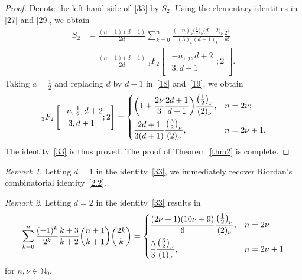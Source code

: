 \documentclass[reqno]{amsart}
\numberwithin{equation}{section}
\theoremstyle{plain}
\theoremstyle{remark}
\newtheorem{rem}{Remark}[section]
\begin{document}
\begin{proof}
Denote the left-hand side of~\eqref{33} by $S_2$.
Using the elementary identities in \eqref{27} and \eqref{29}, we obtain
\begin{align*}
S_2&=\frac{(n+1)(d+1)}{2d}\sum_{k=0}^{n}\frac{(-n)_k\bigl(\frac{1}{2}\bigr)_k\bigl(d+2\bigr)_k}{(3)_k(d+1)_k}\frac{2^k}{k!}\\
&=\frac{(n+1)(d+1)}{2d}{\,}_3F_2\begin{bmatrix}\begin{gathered}-n, \tfrac12, d+2\\ 3, d+1 \end{gathered};2\end{bmatrix}.
\end{align*}
Taking $a=\frac{1}{2}$ and replacing $d$ by $d+1$ in~\eqref{18} and~\eqref{19}, we obtain
\begin{equation*}
{\,}_3F_2\begin{bmatrix}\begin{gathered}-n, \tfrac12, d+2\\ 3, d+1 \end{gathered};2\end{bmatrix}
=\begin{dcases} \biggl(1+\frac{2\nu}{3}\frac{2d+1}{d+1}\biggr)\frac{\bigl(\frac12\bigr)_\nu}{(2)_\nu}, & n=2\nu;\\
\frac{2d+1}{3(d+1)}\frac{\bigl(\frac32\bigr)_\nu}{(2)_\nu}, & n=2\nu+1.
\end{dcases}
\end{equation*}
The identity~\eqref{33} is thus proved.
The proof of Theorem~\ref{thm2} is complete.
\end{proof}

\begin{rem}
Letting $d=1$ in the identity~\eqref{33}, we immediately recover Riordan's combinatorial identity~\eqref{2.2}. 
\end{rem}

\begin{rem}
Letting $d=2$ in the identity~\eqref{33} results in
\begin{equation*}
\sum_{k=0}^{n}\frac{(-1)^k}{2^k}\frac{k+3}{k+2}\binom{n+1}{k+1}{\binom{2k}{k}}
=\begin{dcases}
\frac{(2\nu+1)(10\nu+9)}{6}\frac{\bigl(\frac12\bigr)_\nu}{(2)_\nu}, & n=2\nu\\
\frac{5}{3}\frac{\bigl(\frac32\bigr)_\nu}{(1)_\nu}, &n=2\nu+1
\end{dcases}
\end{equation*}
for $n,\nu\in\mathbb{N}_0$.
\end{rem}
\end{document}
